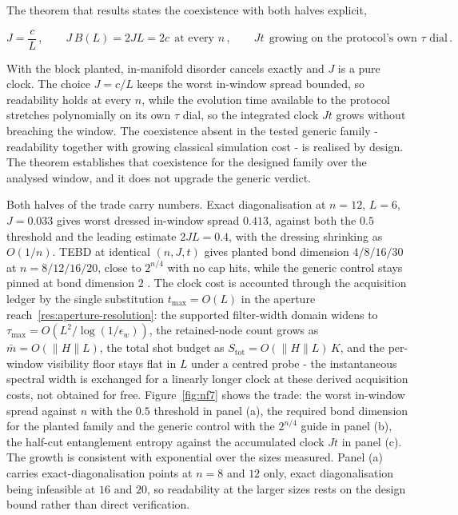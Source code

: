 The theorem that results states the coexistence with both halves explicit,
\begin{widetext}
\begin{equation*}
J = \frac{c}{L}\,, \qquad J\,B(L) = 2JL = 2c \ \ \text{at every } n\,, \qquad Jt \ \ \text{growing on the protocol's own } \tau \text{ dial}\,.
\end{equation*}
\end{widetext}
With the block planted, in-manifold disorder cancels exactly and $J$ is a pure clock. The choice $J = c/L$ keeps the worst in-window spread bounded, so readability holds at every $n$, while the evolution time available to the protocol stretches polynomially on its own $\tau$ dial, so the integrated clock $Jt$ grows without breaching the window. The coexistence absent in the tested generic family - readability together with growing classical simulation cost - is realised by design. The theorem establishes that coexistence for the designed family over the analysed window, and it does not upgrade the generic verdict.

Both halves of the trade carry numbers. Exact diagonalisation at $n = 12$, $L = 6$, $J = 0.033$ gives worst dressed in-window spread $0.413$, against both the $0.5$ threshold and the leading estimate $2JL = 0.4$, with the dressing shrinking as $O(1/n)$. TEBD at identical $(n, J, t)$ gives planted bond dimension $4/8/16/30$ at $n = 8/12/16/20$, close to $2^{n/4}$ with no cap hits, while the generic control stays pinned at bond dimension $2$ \cite{verstraete2008mps}. The clock cost is accounted through the acquisition ledger by the single substitution $t_{\max} = O(L)$ in the aperture reach~\eqref{res:aperture-resolution}: the supported filter-width domain widens to $\tau_{\max} = O(L^{2}/\log(1/\epsilon_{w}))$, the retained-node count grows as $\bar{m} = O(\lVert H\rVert L)$, the total shot budget as $S_{\mathrm{tot}} = O(\lVert H\rVert L)\,K$, and the per-window visibility floor stays flat in $L$ under a centred probe - the instantaneous spectral width is exchanged for a linearly longer clock at these derived acquisition costs, not obtained for free. Figure~\ref{fig:nf7} shows the trade: the worst in-window spread against $n$ with the $0.5$ threshold in panel (a), the required bond dimension for the planted family and the generic control with the $2^{n/4}$ guide in panel (b), the half-cut entanglement entropy against the accumulated clock $Jt$ in panel (c). The growth is consistent with exponential over the sizes measured. Panel (a) carries exact-diagonalisation points at $n = 8$ and $12$ only, exact diagonalisation being infeasible at $16$ and $20$, so readability at the larger sizes rests on the design bound rather than direct verification.

